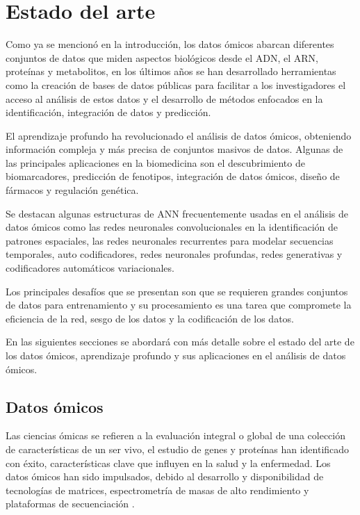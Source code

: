 \section{Estado del arte}


Como ya se mencionó en la introducción, los datos ómicos abarcan diferentes conjuntos de datos que miden aspectos biológicos desde el ADN, el ARN, proteínas y metabolitos, en los últimos años se han desarrollado herramientas como la creación de bases de datos públicas para facilitar a los investigadores el acceso al análisis de estos datos y el desarrollo de métodos enfocados en la identificación, integración de datos y predicción.

El aprendizaje profundo ha revolucionado el análisis de datos ómicos, obteniendo información compleja y más precisa de conjuntos masivos de datos. Algunas de las principales aplicaciones en la biomedicina son el descubrimiento de biomarcadores, predicción de fenotipos, integración de datos ómicos, diseño de fármacos y regulación genética.

Se destacan algunas estructuras de ANN frecuentemente usadas en el análisis de datos ómicos como las redes neuronales convolucionales en la identificación de patrones espaciales, las redes neuronales recurrentes para modelar secuencias temporales, auto codificadores, redes neuronales profundas, redes generativas y codificadores automáticos variacionales.

Los principales desafíos que se presentan son que se requieren grandes conjuntos de datos para entrenamiento y su procesamiento es una tarea que compromete la eficiencia de la red, sesgo de los datos y la codificación de los datos.

En las siguientes secciones se abordará con más detalle sobre el estado del arte de los datos ómicos, aprendizaje profundo y sus aplicaciones en el análisis de datos ómicos.

\subsection{Datos ómicos}

Las ciencias ómicas se refieren a la evaluación integral o global de una colección de características de un ser vivo, el estudio de genes y proteínas han identificado con éxito, características clave que influyen en la salud y la enfermedad. Los datos ómicos han sido impulsados, debido al desarrollo y disponibilidad de tecnologías de matrices, espectrometría de masas de alto rendimiento y plataformas de secuenciación \citep{hasin2017multi}.

